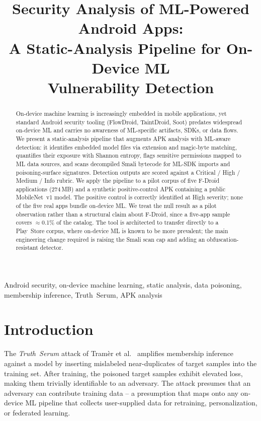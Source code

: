 \documentclass[conference]{IEEEtran}
\begin{document}
\title{Security Analysis of ML-Powered Android Apps:\\
A Static-Analysis Pipeline for On-Device ML\\
Vulnerability Detection}

\author{
}

\maketitle

\begin{abstract}
On-device machine learning is increasingly embedded in mobile
applications, yet standard Android security tooling (FlowDroid,
TaintDroid, Soot) predates widespread on-device ML and carries no
awareness of ML-specific artifacts, SDKs, or data flows. We present a
static-analysis pipeline that augments APK analysis with ML-aware
detection: it identifies embedded model files via extension and
magic-byte matching, quantifies their exposure with Shannon entropy,
flags sensitive permissions mapped to ML data sources, and scans
decompiled Smali bytecode for ML-SDK imports and poisoning-surface
signatures. Detection outputs are scored against a Critical / High /
Medium / Info rubric. We apply the pipeline to a pilot corpus of five
F-Droid applications (274\,MB) and a synthetic positive-control APK
containing a public MobileNet~v1 model. The positive control is
correctly identified at High severity; none of the five real apps bundle
on-device ML. We treat the null result as a pilot observation rather
than a structural claim about F-Droid, since a five-app sample covers
$\approx$0.1\% of the catalog. The tool is architected to transfer
directly to a Play~Store corpus, where on-device ML is known to be more
prevalent; the main engineering change required is raising the Smali
scan cap and adding an obfuscation-resistant detector.
\end{abstract}

\begin{IEEEkeywords}
Android security, on-device machine learning, static analysis, data
poisoning, membership inference, Truth~Serum, APK analysis
\end{IEEEkeywords}

\section{Introduction}
The \emph{Truth~Serum} attack of Tram\`{e}r et al.~\cite{truthserum}
amplifies membership inference against a model by inserting mislabeled
near-duplicates of target samples into the training set. After
training, the poisoned target samples exhibit elevated loss, making
them trivially identifiable to an adversary. The attack presumes that
an adversary can contribute training data -- a presumption that maps
onto any on-device ML pipeline that collects user-supplied data for
retraining, personalization, or federated learning.
\end{document}
